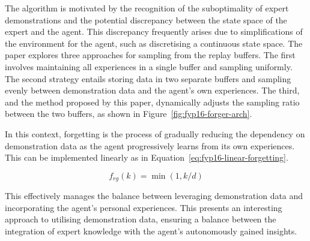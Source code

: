 The algorithm is motivated by the recognition of the suboptimality of expert demonstrations and the potential discrepancy between the state space of the expert and the agent.
This discrepancy frequently arises due to simplifications of the environment for the agent, such as discretising a continuous state space.
The paper explores three approaches for sampling from the replay buffers.
The first involves maintaining all experiences in a single buffer and sampling uniformly.
The second strategy entails storing data in two separate buffers and sampling evenly between demonstration data and the agent's own experiences.
The third, and the method proposed by this paper, dynamically adjusts the sampling ratio between the two buffers, as shown in Figure~\ref{fig:fyp16-forger-arch}.

In this context, forgetting is the process of gradually reducing the dependency on demonstration data as the agent progressively learns from its own experiences.
This can be implemented linearly as in Equation~\ref{eq:fyp16-linear-forgetting}.

\begin{equation}
  f_{rg}(k) = \min(1, k/d)
  \label{eq:fyp16-linear-forgetting}
\end{equation}

This effectively manages the balance between leveraging demonstration data and incorporating the agent's personal experiences.
This presents an interesting approach to utilising demonstration data, ensuring a balance between the integration of expert knowledge with the agent's autonomously gained insights. \\\\

